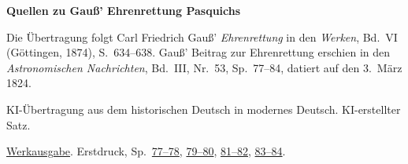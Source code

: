 \clearpage\thispagestyle{empty}
\begin{center}\Large\bfseries Quellen zu Gauß’ Ehrenrettung Pasquichs\end{center}

Die Übertragung folgt Carl Friedrich Gauß’ \emph{Ehrenrettung} in den \emph{Werken}, Bd.~VI (Göttingen, 1874), S.~634--638. Gauß’ Beitrag zur Ehrenrettung erschien in den \emph{Astronomischen Nachrichten}, Bd.~III, Nr.~53, Sp.~77--84, datiert auf den 3.~März 1824.

KI-Übertragung aus dem historischen Deutsch in modernes Deutsch. KI-erstellter Satz.

\href{https://gdz.sub.uni-goettingen.de/id/PPN236007467}{Werkausgabe}. Erstdruck, Sp.~\href{https://api.digitale-sammlungen.de/iiif/image/v2/bsb10049428_00051/full/1600,/0/default.jpg}{77--78}, \href{https://api.digitale-sammlungen.de/iiif/image/v2/bsb10049428_00052/full/1600,/0/default.jpg}{79--80}, \href{https://api.digitale-sammlungen.de/iiif/image/v2/bsb10049428_00053/full/1600,/0/default.jpg}{81--82}, \href{https://api.digitale-sammlungen.de/iiif/image/v2/bsb10049428_00054/full/1600,/0/default.jpg}{83--84}.

\clearpage
